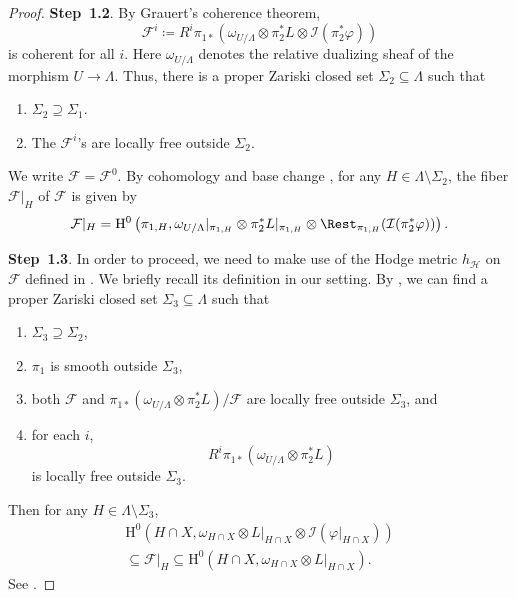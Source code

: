 \begin{proof}
\textbf{Step~1.2}.
By Grauert's coherence theorem,
\[
\mathcal{F}^i\coloneqq R^i\pi_{1*}\left(\omega_{U/\Lambda}\otimes \pi_2^*L\otimes \mathcal{I}(\pi_2^*\varphi) \right)
\]
is coherent for all $i$. Here $\omega_{U/\Lambda}$ denotes the relative dualizing sheaf of the morphism $U\rightarrow \Lambda$.
Thus, there is a proper Zariski closed set $\Sigma_2\subseteq \Lambda$ such that
\begin{enumerate}
    \item\label{itm:chapter-trace:L815:1} $\Sigma_2\supseteq \Sigma_1$.
    \item\label{itm:chapter-trace:L815:2} The $\mathcal{F}^i$'s are locally free outside $\Sigma_2$.
\end{enumerate}
We write $\mathcal{F}=\mathcal{F}^0$.
 By cohomology and base change \cite[Theorem~III.12.11]{Har}, for any $H\in \Lambda\setminus \Sigma_2$,
 the fiber $\mathcal{F}|_H$ of $\mathcal{F}$ is given by
 \[
\mathcal{F}|_H= \mathrm{H}^0\left(\pi_{1,H},\omega_{U/\Lambda}|_{\pi_{1,H}}\otimes \pi_2^*L|_{\pi_{1,H}}\otimes \Rest_{\pi_{1,H}}(\mathcal{I}(\pi_2^*\varphi)) \right).
\]


\textbf{Step~1.3}.
In order to proceed, we need to make use of the Hodge metric $h_{\mathcal{H}}$ on $\mathcal{F}$ defined in \cite{HPS18}. We briefly recall its definition in our setting.
By \cite[Section~22]{HPS18}, we can find a proper Zariski closed set $\Sigma_3\subseteq \Lambda$ such that
\begin{enumerate}
    \item\label{itm:chapter-trace:L830:1} $\Sigma_3\supseteq \Sigma_2$,
    \item\label{itm:chapter-trace:L830:2} $\pi_1$ is smooth outside $\Sigma_3$,
    \item\label{itm:chapter-trace:L830:3} both $\mathcal{F}$ and $\pi_{1*}\left(\omega_{U/\Lambda}\otimes \pi_2^*L \right)/\mathcal{F}$ are locally free outside $\Sigma_3$, and
    \item\label{itm:chapter-trace:L830:4} for each $i$,
    \[
    R^i\pi_{1*}\left(\omega_{U/\Lambda}\otimes \pi_2^*L \right)
    \]
    is locally free outside $\Sigma_3$.
\end{enumerate}
Then for any $H\in \Lambda\setminus \Sigma_3$,
\[
\begin{gathered}
\mathrm{H}^0\left(H\cap X,\omega_{H\cap X}\otimes L|_{H\cap X}\otimes \mathcal{I}(\varphi|_{H\cap X})\right)\\
\subseteq \mathcal{F}|_H\subseteq \mathrm{H}^0\left(H\cap X,\omega_{H\cap X}\otimes L|_{H\cap X}\right).
\end{gathered}
\]
See \cite[Lemma~22.1]{HPS18}.


\end{proof}
